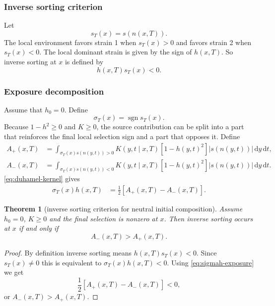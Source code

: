 \documentclass[11pt,a4paper]{report}
\newtheorem{theorem}{Theorem}
\newcommand{\dd}{\,\mathrm d}
\newcommand{\sgn}{\operatorname{sgn}}
\begin{document}
	\subsubsection{Inverse sorting criterion}
	Let
	\begin{equation}
		s_T(x)=s(n(x,T)).
	\end{equation}
	The local environment favors strain 1 when \(s_T(x)>0\) and favors strain 2 when \(s_T(x)<0\). The local dominant strain is given by the sign of \(h(x,T)\). So inverse sorting at \(x\) is defined by
	\begin{equation}
		{
			h(x,T)s_T(x)<0.
		}
		\label{eq:inverse-def}
	\end{equation}
	
	\subsubsection{Exposure decomposition}
	Assume that \(h_0=0\). Define
	\begin{equation}
		\sigma_T(x)=\sgn s_T(x).
	\end{equation}
	Because \(1-h^2\geq0\) and \(K\geq0\), the source contribution can be split into a part that reinforces the final local selection sign and a part that opposes it.  Define
	\begin{align}
		A_+(x,T)&=\int_{\sigma_T(x)s(n(y,t))>0}
		K(y,t\mid x,T)[1-h(y,t)^2]|s(n(y,t))|\dd y\dd t,
		\label{eq:Aplus}\\
		A_-(x,T)&=\int_{\sigma_T(x)s(n(y,t))<0}
		K(y,t\mid x,T)[1-h(y,t)^2]|s(n(y,t))|\dd y\dd t.
		\label{eq:Aminus}
	\end{align}
	\eqref{eq:duhamel-kernel} gives
	\begin{align}
		\sigma_T(x)h(x,T)
		&=\frac12\left[A_+(x,T)-A_-(x,T)\right].
		\label{eq:sigmah-exposure}
	\end{align}
	\begin{theorem}[inverse sorting criterion for neutral initial composition]
		Assume \(h_0=0\), \(K\geq0\) and the final selection is nonzero at \(x\). Then inverse sorting occurs at \(x\) if and only if
		\begin{equation}
			{A_-(x,T)>A_+(x,T).}
			\label{eq:exposure-criterion}
		\end{equation}
	\end{theorem}	
	\begin{proof}
		By definition inverse sorting means \(h(x,T)s_T(x)<0\). Since \(s_T(x)\neq0\) this is equivalent to \(\sigma_T(x)h(x,T)<0\). Using \cref{eq:sigmah-exposure} we get
		\begin{equation}
			\frac12[A_+(x,T)-A_-(x,T)]<0,
		\end{equation}
		or \(A_-(x,T)>A_+(x,T)\).
	\end{proof}
\end{document}

